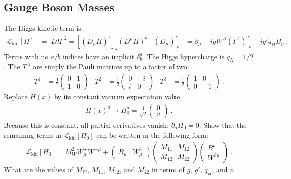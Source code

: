 \documentclass[12pt]{article}
\begin{document}
\subsection{Gauge Boson Masses}
The Higgs kinetic term is:
\begin{align}
	\mathcal L_\text{kin}[H] &= |DH|^2 = \left[\left(D_\mu H\right)^\dag\right]_a
		\left(D^\mu H\right)^a
	&
	\left(D_\mu\right)^a_{\phantom{a}b} &= \partial_\mu 
	- i g W^A \left(T^{A}\right)^a_{\phantom{a}b}
	- ig' q_H B_\mu \ .	
\end{align}
Terms with no $a/b$ indices have an implicit $\delta^a_b$. The Higgs hypercharge is $q_H = 1/2$. The $T^A$ are simply the Pauli matrices up to a factor of two:
\begin{align}
	T^1 &= \frac{1}{2}
	\begin{pmatrix}
	0 & 1 \\
	1 & 0	
	\end{pmatrix}
	&
	T^2 &= \frac{1}{2}
	\begin{pmatrix}
	0 & -i \\
	i & 0	
	\end{pmatrix}
	&
	T^3 &= \frac{1}{2}
	\begin{pmatrix}
	1 & 0 \\
	0 & -1	
	\end{pmatrix}
	\ .
\end{align}
Replace $H(x)$ by its constant vacuum expectation value,
\begin{align}
H(x)^a \to H_0^a = 
\frac{1}{\sqrt{2}}
\begin{pmatrix}
	0\\
	v
\end{pmatrix} \ .
\label{eq:Higgs:vev}
\end{align}
Because this is constant, all partial derivatives vanish: $\partial_\mu H_0 = 0$. Show that the remaining terms in $\mathcal L_\text{kin}[H_0]$ can be written in the following form:
\begin{align}
	\mathcal L_\text{kin}[H_0]
	= M_W^2 W_\mu^+ W^{-\mu} + 
	\begin{pmatrix}
		B_\mu & W^3_\mu
	\end{pmatrix}
	\begin{pmatrix}
		M_{11} & M_{12}
		\\
		M_{12} & M_{22}
	\end{pmatrix}
	\begin{pmatrix}
		B^\mu \\ W^{3\mu}
	\end{pmatrix} \ .
	\label{eq:Gauge:mass}
\end{align}
What are the values of $M_W$, $M_{11}$, $M_{12}$, and $M_{22}$ in terms of $g$, $g'$, $q_H$, and $v$.  
\end{document}
